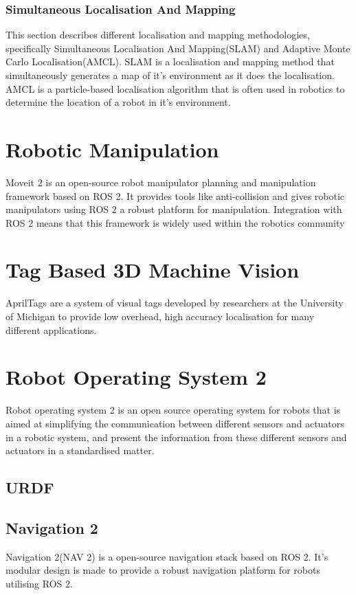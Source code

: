 \subsubsection{Simultaneous Localisation And Mapping}
This section describes different localisation and mapping methodologies, specifically Simultaneous Localisation And Mapping(SLAM) and Adaptive Monte Carlo Localisation(AMCL). SLAM is a localisation and mapping method that simultaneously generates a map of it's environment as it does the localisation. AMCL is a particle-based localisation algorithm that is often used in robotics to determine the location of a robot in it's environment.

\section{Robotic Manipulation}
Moveit 2 is an open-source robot manipulator planning and manipulation framework based on ROS 2. It provides tools like anti-collision and gives robotic manipulators using  ROS 2 a robust platform for manipulation. Integration with ROS 2 means that this framework is widely used within the robotics community

\section{Tag Based 3D Machine Vision}\label{sec:T:TagBased3DMachineVision}
AprilTags are a system of visual tags developed by researchers at the University of Michigan to provide low overhead, high accuracy localisation for many different applications. 

\section{Robot Operating System 2}
Robot operating system 2 is an open source operating system for robots that is aimed at simplifying the communication between different sensors and actuators in a robotic system, and present the information from these different sensors and actuators in a standardised matter.

\subsection{URDF}


\subsection{Navigation 2}
Navigation 2(NAV 2) is a open-source navigation stack based on ROS 2. It's modular design is made to provide a robust navigation platform for robots utilising ROS 2.
